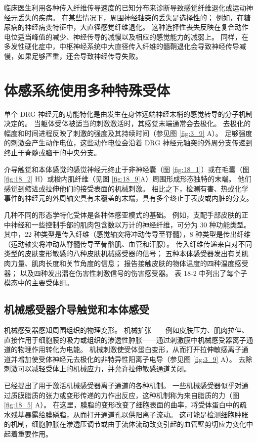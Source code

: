 临床医生利用各种传入纤维传导速度的已知分布来诊断导致感觉纤维退化或运动神经元丢失的疾病。 
在某些情况下，周围神经轴突的丢失是选择性的； 例如，在糖尿病的神经病变特征中，大直径感觉纤维退化。
这种选择性丧失反映在复合动作电位适当峰值的减少、神经传导的减慢以及相应的感觉能力的减弱上。 
同样，在多发性硬化症中，中枢神经系统中大直径传入纤维的髓鞘退化会导致神经传导减慢，如果足够严重，还会导致神经传导失败。


\section{体感系统使用多种特殊受体}
单个 DRG 神经元的功能特化是由发生在身体远端神经末梢的感觉转导的分子机制决定的。 
当躯体受体被适当的刺激激活时，其感觉末端通常会去极化。 
去极化的幅度和时间进程反映了刺激的强度及其持续时间（参见图 \ref{fig:3_9} A）。 
足够强度的刺激会产生动作电位，这些动作电位会沿着 DRG 神经元轴突的外周分支传递到终止于脊髓或脑干的中央分支。


介导触觉和本体感觉的感觉神经元终止于非神经囊（图 \ref{fig:18_1}）或在毛囊（图 \ref{fig:18_2} H）或梭内肌纤维（见图 \ref{fig:18_9}A）周围形成形态独特的末端。 
他们感觉到缩进或拉伸他们的接受表面的机械刺激。 
相比之下，检测有害、热或化学事件的神经元的外周轴突具有未覆盖的末端，具有多个终止于表皮或内脏的分支。


几种不同的形态学特化受体是各种体感亚模式的基础。 
例如，支配手部皮肤的正中神经和一些控制手部的肌肉包含数以万计的神经纤维，可分为 30 种功能类型。 其中，22 种类型是传入纤维（感觉轴突将冲动传导至脊髓），8 种类型是传出纤维（运动轴突将冲动从脊髓传导至骨骼肌、血管和汗腺）。 
传入纤维传递来自对不同类型的皮肤变形敏感的八种皮肤机械感受器的信号； 五种本体感受器发出有关肌肉力量、肌肉长度和关节角度的信息； 报告接触皮肤的物体温度的四种温度感受器； 以及四种发出潜在伤害性刺激信号的伤害感受器。 
表 18-2 中列出了每个子模态中的主要受体组。


\subsection{机械感受器介导触觉和本体感受}
机械感受器感知周围组织的物理变形。 
机械扩张——例如皮肤压力、肌肉拉伸、直接作用于细胞膜的吸力或组织的渗透性肿胀——通过刺激膜中机械感受器离子通道的物理作用转化为电能。 
机械刺激使受体蛋白变形，从而打开拉伸敏感离子通道并增加使受体神经元去极化的非特异性阳离子电导（参见图 \ref{fig:3_9} A）。 
去除刺激可以减轻受体上的机械应力，并允许拉伸敏感通道关闭。


已经提出了用于激活机械感受器离子通道的各种机制。 
一些机械感受器似乎对通过质膜脂质的张力或变形传递的力作出反应，这种机制称为来自脂质的力（图 \ref{fig:18_5} A）。 
在这里，膜脂的变形改变了细胞表面的曲率，将受体蛋白中的疏水残基暴露给膜磷脂，从而打开通道孔以供阳离子流动。 
这可能是检测细胞肿胀的机制，细胞肿胀在渗透压调节或由于流体流动改变引起的血管壁剪切应力变化中起着重要作用。

